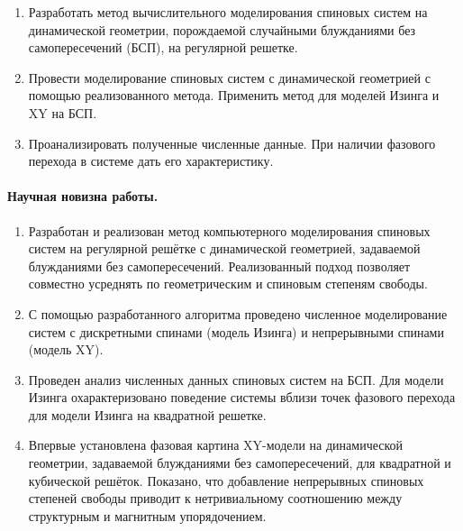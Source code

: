 \begin{enumerate}
	\item Разработать метод вычислительного моделирования спиновых систем  на  динамической геометрии, порождаемой случайными блужданиями без самопересечений (БСП),  на регулярной решетке. 
	
	\item Провести моделирование спиновых систем с динамической геометрией с помощью реализованного метода. Применить метод для моделей Изинга и XY на БСП. 
	
	
	\item Проанализировать полученные численные данные. При наличии фазового перехода в системе дать его характеристику. 
	
\end{enumerate}


\paragraph*{Научная новизна работы.}

\begin{enumerate}
	
	\item Разработан и реализован метод компьютерного моделирования спиновых систем на регулярной решётке с динамической геометрией, задаваемой блужданиями без самопересечений. Реализованный подход позволяет совместно усреднять по геометрическим и спиновым степеням свободы. 
	
	\item С помощью    разработанного  алгоритма проведено численное моделирование систем с дискретными спинами (модель Изинга) и непрерывными спинами (модель XY).
	
	\item Проведен анализ численных данных спиновых систем на БСП. Для модели Изинга охарактеризовано поведение системы вблизи точек фазового перехода для модели Изинга на квадратной решетке. 
	
	\item Впервые установлена фазовая картина XY-модели на динамической геометрии,
	задаваемой блужданиями без самопересечений, для квадратной и кубической решёток.
	Показано, что добавление непрерывных спиновых степеней свободы приводит
	к нетривиальному соотношению между структурным и магнитным упорядочением.
  


\end{enumerate}


